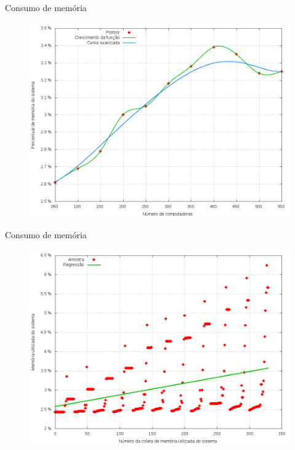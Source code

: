 \begin{frame}{Consumo de memória}

    \begin{figure}[!htb]
        \centering
        \includegraphics[scale=.35]{images/memory-usage-growth}
    \end{figure}
\end{frame}



\begin{frame}{Consumo de memória}

    \begin{figure}[!htb]
        \centering
        \includegraphics[scale=.35]{images/scatter-memory-usage}
    \end{figure}
\end{frame}


